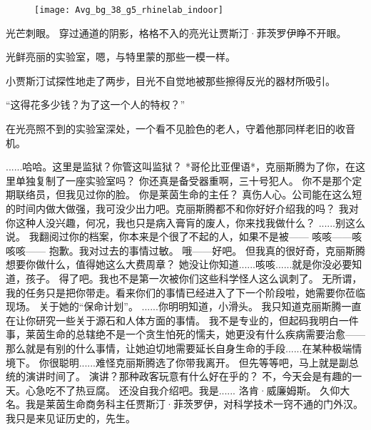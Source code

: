 \documentclass[openany]{book}
\begin{document}
\begin{figure}[h]
    \centering
    \texttt{[image: Avg\_bg\_38\_g5\_rhinelab\_indoor]}
\end{figure}
光芒刺眼。
穿过通道的阴影，格格不入的亮光让贾斯汀·菲茨罗伊睁不开眼。\par
光鲜亮丽的实验室，嗯，与特里蒙的那些一模一样。\par
小贾斯汀试探性地走了两步，目光不自觉地被那些擦得反光的器材所吸引。\par
“这得花多少钱？为了这一个人的特权？”\par
在光亮照不到的实验室深处，一个看不见脸色的老人，守着他那同样老旧的收音机。\par
\begin{dialogue}
     ......哈哈。这里是监狱？你管这叫监狱？
     *哥伦比亚俚语*，克丽斯腾为了你，在这里单独复制了一座实验室吗？
     你还真是备受器重啊，三十号犯人。
     你不是那个定期联络员，但我见过你的脸。
     你是莱茵生命的主任？
     真伤人心。公司能在这么短的时间内做大做强，我可没少出力吧。克丽斯腾都不和你好好介绍我的吗？
     我对你这种人没兴趣，何况，我也只是病入膏肓的废人，你来找我做什么？
     ......别这么说。
     我翻阅过你的档案，你本来是个很了不起的人，如果不是被——
     咳咳——咳咳咳——
     抱歉。我对过去的事情过敏。
     哦——好吧。
     但我真的很好奇，克丽斯腾想要你做什么，值得她这么大费周章？
     她没让你知道......咳咳......就是你没必要知道，孩子。
     得了吧。我也不是第一次被你们这些科学怪人这么讽刺了。
     无所谓，我的任务只是把你带走。看来你们的事情已经进入了下一个阶段啦，她需要你莅临现场。
     关于她的“保命计划”。
     ......你明明知道，小滑头。
     我只知道克丽斯腾一直在让你研究一些关于源石和人体方面的事情。
     我不是专业的，但起码我明白一件事，莱茵生命的总辖绝不是一个贪生怕死的懦夫，她更没有什么疾病需要治愈——
     那么就是有别的什么事情，让她迫切地需要延长自身生命的手段......在某种极端情境下。
     你很聪明......难怪克丽斯腾选了你带我离开。
     但先等等吧，马上就是副总统的演讲时间了。
     演讲？那种政客玩意有什么好在乎的？
     不，今天会是有趣的一天。心急吃不了热豆腐。
     还没自我介绍吧。我是......
     洛肯·威廉姆斯。
     久仰大名。我是莱茵生命商务科主任贾斯汀·菲茨罗伊，对科学技术一窍不通的门外汉。
     我只是来见证历史的，先生。
\end{dialogue}
\end{document}
